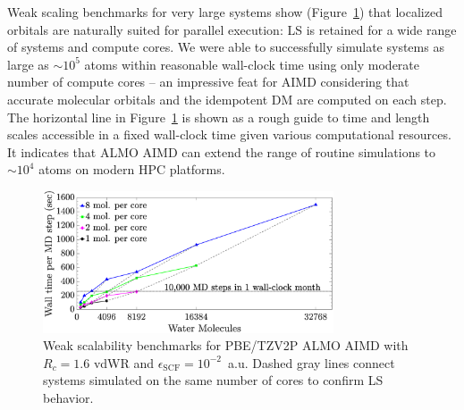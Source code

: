 \documentclass[aps,prl,reprint,amsmath,amssymb]{revtex4-1}
\begin{document}

Weak scaling benchmarks for very large systems show (Figure~\ref{fig:weakscaling}) that localized orbitals are naturally suited for parallel execution: LS is retained for a wide range of systems and compute cores. 
We were able to successfully simulate systems as large as $\sim10^{5}$ atoms 
within reasonable wall-clock time using only moderate number of compute cores -- an impressive feat for AIMD considering that accurate molecular orbitals and the idempotent DM are computed on each step.
The horizontal line in Figure~\ref{fig:weakscaling} is shown as a rough guide to time and length scales accessible in a fixed wall-clock time given various computational resources. It indicates that ALMO AIMD can extend the range of routine simulations to $\sim10^4$ atoms on modern HPC platforms. 



\begin{figure}
\includegraphics[trim={1.6cm 0.8cm 4.7cm 0cm},clip,width=8.6cm]{weakscaling.eps}
\caption{\label{fig:weakscaling} Weak scalability benchmarks for PBE/TZV2P ALMO AIMD with  $R_{c} = 1.6$ vdWR and $\epsilon_{\text{SCF}} = 10^{-2}$~a.u. 
Dashed gray lines connect systems simulated on the same number of cores to confirm LS behavior. %
}
\end{figure}

\end{document}
